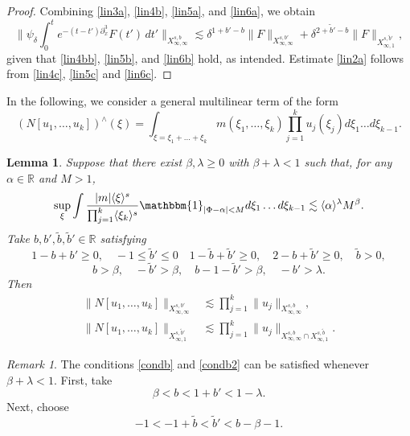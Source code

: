 \documentclass[a4paper, 11pt]{amsart}
\newcommand{\R}{\mathbb{R}}
\newcommand{\jap}[1]{\langle #1 \rangle}
\theoremstyle{plain}
\newtheorem{lem}[thm]{Lemma}
\theoremstyle{definition}
\theoremstyle{remark}
\newtheorem{nb}[thm]{Remark}
\newcommand{\5}{\text{V}}
\newcommand{\noi}{\noindent}
\newcommand{\les}{\lesssim}
\newcommand{\dl}{\delta}
\newcommand{\wt}{\widetilde}
\newcommand{\dx}{\partial_x}
\numberwithin{equation}{section}
\theoremstyle{mytheoremstyle} \newtheorem{nota}[thm]{Remark}
\theoremstyle{mytheoremstyle} \newtheorem{exemplo}[thm]{Example}
\begin{document}
\begin{proof}
\noi
Combining \eqref{lin3a}, \eqref{lin4b}, \eqref{lin5a}, and \eqref{lin6a}, we obtain
\begin{equation}
\bigg\| \psi_{\dl} \int_0^t e^{-(t-t')\dx^3} F(t') \, dt' \bigg\|_{X^{s,b}_{\infty, \infty}} \les \dl^{1+b'-b} \| F\|_{X^{s, b'}_{\infty, \infty}} + \dl^{2+\wt{b}' -b} \|F\|_{X^{s, \wt{b}'}_{\infty, 1}},
\end{equation}
given that \eqref{lin4bb}, \eqref{lin5b}, and \eqref{lin6b} hold, as intended. Estimate \eqref{lin2a} follows from \eqref{lin4c}, \eqref{lin5c} and \eqref{lin6c}. \qedhere
\end{proof}



In the following, we consider a general multilinear term of the form
$$
(N[u_1,\dots, u_k])^\wedge(\xi)=\int_{\xi=\xi_1+\dots+\xi_k} m(\xi_1,\dots,\xi_k)\prod_{j=1}^ku_j(\xi_j) d\xi_1\dots d\xi_{k-1}.
$$

\begin{lem}
    Suppose that there exist $\beta,\lambda\ge 0$ with $\beta+\lambda<1$ such that, for any $\alpha\in \R$ and $M>1$,
    \begin{equation}\label{fre}
        \sup_{\xi} \int \frac{|m|\jap{\xi}^s}{\prod_{j=1}^k\jap{\xi_k}^s} \mathbbm{1}_{|\Phi-\alpha|<M} d\xi_1\dots d\xi_{k-1} \lesssim \jap{\alpha}^\lambda M^\beta.
    \end{equation}
    Take $b,b',\tilde{b},\tilde{b}'\in \R$ satisfying
    \begin{equation}\label{condb}
        1-b+b'\ge 0,\quad -1\le \wt{b}'\le 0\quad 1-\wt{b}+\wt{b}'\ge 0,\quad 2-b+\wt{b}'\ge 0,\quad \wt{b}> 0,
    \end{equation}
    \begin{equation}\label{condb2}
       b> \beta,\quad-\wt{b}'>\beta,\quad b-1-\wt{b}'>\beta,\quad -b'>\lambda.
    \end{equation}
    Then
    \begin{align}
	\|N[u_1,\dots, u_k] \|_{X^{s,b'}_{\infty, \infty}} & \les \prod_{j=1}^k\|u_j\|_{X^{s,b}_{\infty, \infty}}, \\
 \|N[u_1,\dots, u_k] \|_{X^{s,\wt{b}'}_{\infty, 1}} & \les \prod_{j=1}^k\|u_j\|_{X^{s,b}_{\infty, \infty} \cap X^{s,\tilde{b}}_{\infty,1}}.
\end{align}
    
\end{lem}
\begin{nb}
    The conditions \eqref{condb} and \eqref{condb2} can be satisfied whenever $\beta+\lambda<1$. First, take 
    $$
    \beta < b < 1+b'< 1-\lambda.
    $$
    Next, choose
    $$
    -1<-1+\wt{b}<\wt{b}'<b-\beta-1.
    $$
\end{nb}
\end{document}
